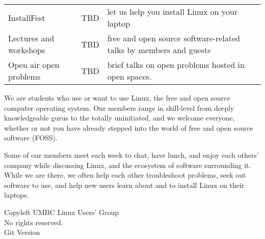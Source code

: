 \documentclass[11pt]{article}
\newcommand{\foss}{FOSS}
\newcommand{\tbd}{TBD}
\begin{document}
\begin{multicols*}{2}
\begin{tabular*}{0.9\textwidth}{p{2.5cm}cp{8cm}}
    InstallFest            & \tbd & let us help you install Linux on your laptop \\
    Lectures and workshops & \tbd & free and open source software-related talks by
        members and guests \\
    Open air open problems & \tbd & brief talks on open problems hosted in open
        spaces.
\end{tabular*}


\vfill
\phantom{x}
\columnbreak{}



We are students who use or want to use Linux, the free and open source computer
operating system. Our members range in skill-level from deeply knowledgeable
gurus to the totally uninitiated, and we welcome everyone, whether or not you
have already stepped into the world of free and open source software (\foss).

Some of our members meet each week to chat, have lunch, and enjoy each others'
company while discussing Linux, and the ecosystem of software surrounding it.
While we are there, we often help each other troubleshoot problems, seek out
software to use, and help new users learn about and to install Linux on their
laptops.

\phantom{x}
\vfill
\begin{center} \tiny
    \textcopyleft{} Copyleft \the\year{} UMBC Linux Users' Group \\
    No rights reserved. \\
    Git Version 
\end{center}
\end{multicols*}
\end{document}
